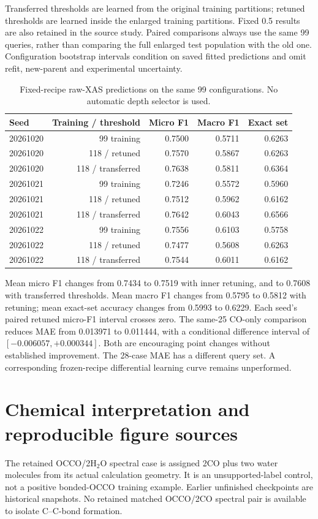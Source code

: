 Transferred thresholds are learned from the original training partitions; retuned thresholds are learned inside the enlarged training partitions. Fixed 0.5 results are also retained in the source study. Paired comparisons always use the same 99 queries, rather than comparing the full enlarged test population with the old one. Configuration bootstrap intervals condition on saved fitted predictions and omit refit, new-parent and experimental uncertainty.
\begin{table}[!htbp]\centering\small
\caption{Fixed-recipe raw-XAS predictions on the same 99 configurations. No automatic depth selector is used.}
\begin{tabular}{lrrrr}\toprule
Seed & Training / threshold & Micro F1 & Macro F1 & Exact set\\\midrule
20261020 & 99 training & 0.7500 & 0.5711 & 0.6263\\
20261020 & 118 / retuned & 0.7570 & 0.5867 & 0.6263\\
20261020 & 118 / transferred & 0.7638 & 0.5811 & 0.6364\\
20261021 & 99 training & 0.7246 & 0.5572 & 0.5960\\
20261021 & 118 / retuned & 0.7512 & 0.5962 & 0.6162\\
20261021 & 118 / transferred & 0.7642 & 0.6043 & 0.6566\\
20261022 & 99 training & 0.7556 & 0.6103 & 0.5758\\
20261022 & 118 / retuned & 0.7477 & 0.5608 & 0.6263\\
20261022 & 118 / transferred & 0.7544 & 0.6011 & 0.6162\\
\bottomrule\end{tabular}\end{table}

Mean micro F1 changes from 0.7434 to 0.7519 with inner retuning, and to 0.7608 with transferred thresholds. Mean macro F1 changes from 0.5795 to 0.5812 with retuning; mean exact-set accuracy changes from 0.5993 to 0.6229. Each seed's paired retuned micro-F1 interval crosses zero. The same-25 CO-only comparison reduces MAE from 0.013971 to 0.011444, with a conditional difference interval of $[-0.006057,+0.000344]$. Both are encouraging point changes without established improvement. The 28-case MAE has a different query set. A corresponding frozen-recipe differential learning curve remains unperformed.

\section{Chemical interpretation and reproducible figure sources}
The retained OCCO/2H$_2$O spectral case is assigned 2CO plus two water molecules from its actual calculation geometry. It is an unsupported-label control, not a positive bonded-OCCO training example. Earlier unfinished checkpoints are historical snapshots. No retained matched OCCO/2CO spectral pair is available to isolate C--C-bond formation.

